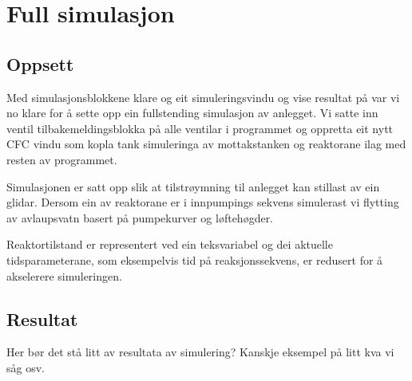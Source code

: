 \section{Full simulasjon}
\thispagestyle{fancy}

\subsection{Oppsett}
Med simulasjonsblokkene klare og eit simuleringsvindu og vise resultat på var vi
no klare for å sette opp ein fullstending simulasjon av anlegget.
Vi satte inn ventil tilbakemeldingsblokka på alle ventilar i programmet og oppretta eit
nytt CFC vindu som kopla tank simuleringa av mottakstanken og reaktorane ilag med resten av
programmet.

Simulasjonen er satt opp slik at tilstrøymning til anlegget kan stillast av ein glidar.
Dersom ein av reaktorane er i innpumpings sekvens simulerast vi flytting av avlaupsvatn
basert på pumpekurver og løftehøgder.

Reaktortilstand er representert ved ein teksvariabel og
dei aktuelle tidsparameterane, som eksempelvis tid på reaksjonssekvens,
er redusert for å akselerere simuleringen.

\subsection{Resultat}

Her bør det stå litt av resultata av simulering? \newline
Kanskje eksempel på litt kva vi såg osv.\newline
